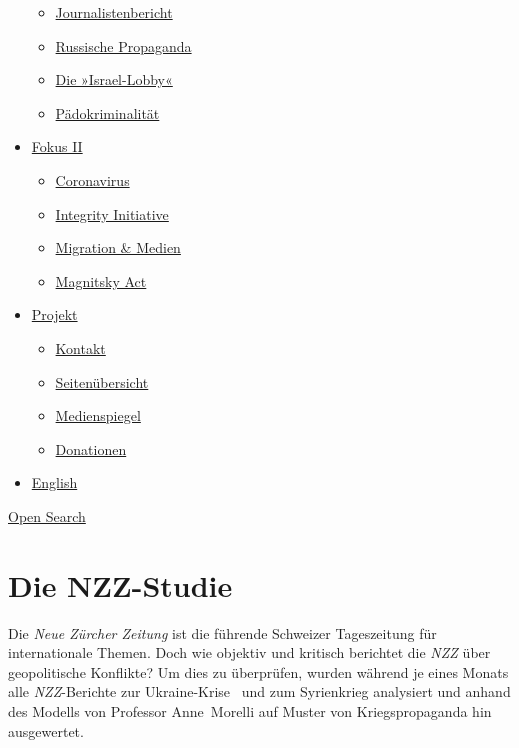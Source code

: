 \begin{itemize}
  \begin{itemize}
  \tightlist
  \item
    \href{https://swprs.org/bericht-eines-journalisten/}{Journalistenbericht}
  \item
    \href{https://swprs.org/russische-propaganda/}{Russische Propaganda}
  \item
    \href{https://swprs.org/die-israel-lobby-fakten-und-mythen/}{Die
    »Israel-Lobby«}
  \item
    \href{https://swprs.org/geopolitik-und-paedokriminalitaet/}{Pädokriminalität}
  \end{itemize}
\item
  \href{https://swprs.org/migration-und-medien/}{Fokus II}

  \begin{itemize}
  \tightlist
  \item
    \href{https://swprs.org/covid-19-hinweis-ii/}{Coronavirus}
  \item
    \href{https://swprs.org/die-integrity-initiative/}{Integrity
    Initiative}
  \item
    \href{https://swprs.org/migration-und-medien/}{Migration \& Medien}
  \item
    \href{https://swprs.org/der-fall-magnitsky/}{Magnitsky Act}
  \end{itemize}
\item
  \href{https://swprs.org/kontakt/}{Projekt}

  \begin{itemize}
  \tightlist
  \item
    \href{https://swprs.org/kontakt/}{Kontakt}
  \item
    \href{https://swprs.org/uebersicht/}{Seitenübersicht}
  \item
    \href{https://swprs.org/medienspiegel/}{Medienspiegel}
  \item
    \href{https://swprs.org/donationen/}{Donationen}
  \end{itemize}
\item
  \href{https://swprs.org/contact/}{English}
\end{itemize}

\protect\hyperlink{}{Open Search}

\hypertarget{die-nzz-studie}{%
\section{Die NZZ-Studie}\label{die-nzz-studie}}

Die \emph{Neue Zürcher Zeitung} ist die führende Schweizer Tages­zeitung
für internationale Themen. Doch wie objektiv und kritisch berichtet die
\emph{NZZ} über geopolitische Konflikte? Um dies zu überprüfen, wurden
während je eines Monats alle \emph{NZZ}-Berichte zur Ukraine-Krise ~und
zum Syrienkrieg analysiert und anhand des Modells von Professor
Anne~Morelli auf Muster von Kriegs­propaganda hin ausgewertet.

